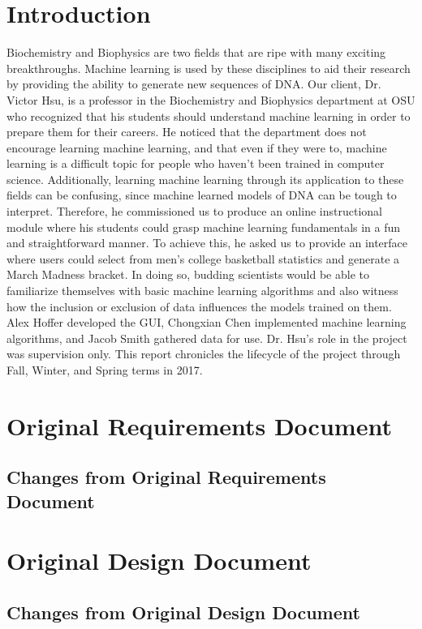 \documentclass[onecolumn, draftclsnofoot,10pt, compsoc]{IEEEtran}
\begin{document}
\section{Introduction}
Biochemistry and Biophysics are two fields that are ripe with many exciting breakthroughs. Machine learning is used by these disciplines to aid their research by providing the ability to generate new sequences of DNA. Our client, Dr. Victor Hsu, is a professor in the Biochemistry and Biophysics department at OSU who recognized that his students should understand machine learning in order to prepare them for their careers. He noticed that the department does not encourage learning machine learning, and that even if they were to, machine learning is a difficult topic for people who haven't been trained in computer science. Additionally, learning machine learning through its application to these fields can be confusing, since machine learned models of DNA can be tough to interpret. Therefore, he commissioned us to produce an online instructional module where his students could grasp machine learning fundamentals in a fun and straightforward manner. To achieve this, he asked us to provide an interface where users could select from men's college basketball statistics and generate a March Madness bracket. In doing so, budding scientists would be able to familiarize themselves with basic machine learning algorithms and also witness how the inclusion or exclusion of data influences the models trained on them. Alex Hoffer developed the GUI, Chongxian Chen implemented machine learning algorithms, and Jacob Smith gathered data for  use. Dr. Hsu's role in the project was supervision only. This report chronicles the lifecycle of the project through Fall, Winter, and Spring terms in 2017.

\section{Original Requirements Document}

\subsection{Changes from Original Requirements Document}

\section{Original Design Document}

\subsection{Changes from Original Design Document}
\end{document}
